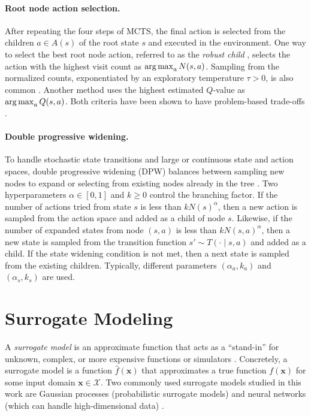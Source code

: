 \paragraph{Root node action selection.}\label{par:root_selection}
After repeating the four steps of MCTS, the final action is selected from the children $a \in A(s)$ of the root state $s$ and executed in the environment.
One way to select the best root node action, referred to as the \textit{robust child} \cite{schadd2009monte, browne2012survey}, selects the action with the highest visit count as $\argmax_a N(s,a)$.
Sampling from the normalized counts, exponentiated by an exploratory temperature $\tau > 0$, is also common \cite{silver2017mastering}.
Another method uses the highest estimated $Q$-value as $\argmax_a Q(s,a)$.
Both criteria have been shown to have problem-based trade-offs \cite{browne2012survey}.


\paragraph{Double progressive widening.}\label{sec:dpw}
To handle stochastic state transitions and large or continuous state and action spaces, double progressive widening (DPW) balances between sampling new nodes to expand or selecting from existing nodes already in the tree \cite{couetoux2011continuous}.
Two hyperparameters $\alpha \in [0,1]$ and $k \ge 0$ control the branching factor.
If the number of actions tried from state $s$ is less than $kN(s)^\alpha$, then a new action is sampled from the action space and added as a child of node $s$.
Likewise, if the number of expanded states from node $(s,a)$ is less than $kN(s,a)^\alpha$, then a new state is sampled from the transition function $s' \sim T(\cdot \mid s, a)$ and added as a child.
If the state widening condition is not met, then a next state is sampled from the existing children.
Typically, different parameters $(\alpha_a, k_a)$ and $(\alpha_s, k_s)$ are used.

\section{Surrogate Modeling}
A \textit{surrogate model} is an approximate function that acts as a ``stand-in'' for unknown, complex, or more expensive functions or simulators \cite{forrester2008engineering}.
Concretely, a surrogate model is a function $\hat{f}(\mathbf{x})$ that approximates a true function $f(\mathbf{x})$ for some input domain $\mathbf{x} \in \mathcal{X}$.
Two commonly used surrogate models studied in this work are Gaussian processes (probabilistic surrogate models) \cite{williams2006gaussian} and neural networks (which can handle high-dimensional data) \cite{hornik1989multilayer}.

